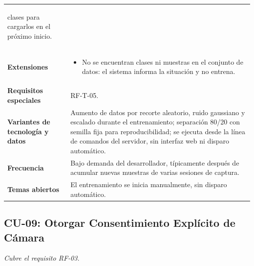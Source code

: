 \begin{longtable}{@{}>{\raggedright\arraybackslash}p{4.1cm} >{\raggedright\arraybackslash}p{\dimexpr\textwidth-4.1cm-2\tabcolsep\relax}@{}}
\begin{enumerate}[leftmargin=*, itemsep=2pt]
    clases para cargarlos en el próximo inicio.
\end{enumerate} \\
\textbf{Extensiones} &
\begin{itemize}[leftmargin=*, itemsep=2pt]
    \item[2a.] No se encuentran clases ni muestras en el conjunto de
    datos: el sistema informa la situación y no entrena.
\end{itemize} \\
\textbf{Requisitos especiales} & RF-T-05. \\
\textbf{Variantes de tecnología y datos} &
Aumento de datos por recorte aleatorio, ruido gaussiano y escalado
durante el entrenamiento; separación 80/20 con semilla fija para
reproducibilidad; se ejecuta desde la línea de comandos del servidor, sin
interfaz web ni disparo automático. \\
\textbf{Frecuencia} &
Bajo demanda del desarrollador, típicamente después de acumular nuevas
muestras de varias sesiones de captura. \\
\textbf{Temas abiertos} &
El entrenamiento se inicia manualmente, sin disparo automático. \\
\bottomrule
\end{longtable}

\subsection{CU-09: Otorgar Consentimiento Explícito de Cámara}
\textit{Cubre el requisito RF-03.}

